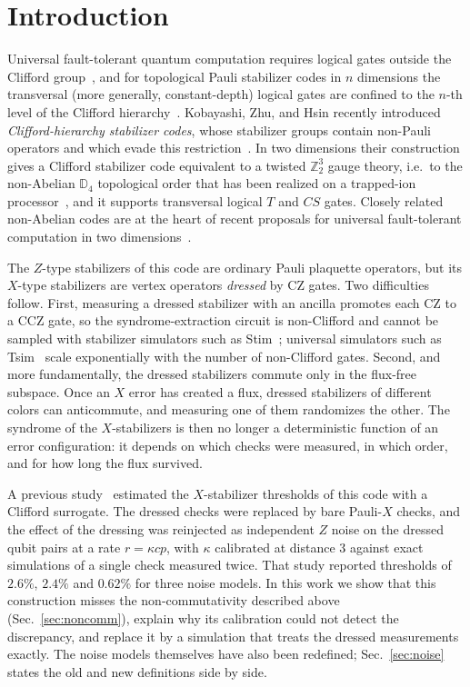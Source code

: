 \documentclass[a4paper]{article}
\begin{document}

\section{Introduction}
\label{sec:intro}

Universal fault-tolerant quantum computation requires logical gates outside the Clifford group~\cite{eastin-knill2009}, and for topological Pauli stabilizer codes in $n$ dimensions the transversal (more generally, constant-depth) logical gates are confined to the $n$-th level of the Clifford hierarchy~\cite{bravyikonig2013}. Kobayashi, Zhu, and Hsin recently introduced \emph{Clifford-hierarchy stabilizer codes}, whose stabilizer groups contain non-Pauli operators and which evade this restriction~\cite{kobayashi2025clifford}. In two dimensions their construction gives a Clifford stabilizer code equivalent to a twisted $\mathbb{Z}_2^3$ gauge theory, i.e.\ to the non-Abelian $\mathbb{D}_4$ topological order that has been realized on a trapped-ion processor~\cite{iqbal2024nonabelian}, and it supports transversal logical $T$ and $CS$ gates. Closely related non-Abelian codes are at the heart of recent proposals for universal fault-tolerant computation in two dimensions~\cite{davydova2025knots,magdalena2026}.

The $Z$-type stabilizers of this code are ordinary Pauli plaquette operators, but its $X$-type stabilizers are vertex operators \emph{dressed} by CZ gates. Two difficulties follow. First, measuring a dressed stabilizer with an ancilla promotes each CZ to a CCZ gate, so the syndrome-extraction circuit is non-Clifford and cannot be sampled with stabilizer simulators such as Stim~\cite{gidney2021stim,gottesmanknill1998}; universal simulators such as Tsim~\cite{haenel2026tsim} scale exponentially with the number of non-Clifford gates. Second, and more fundamentally, the dressed stabilizers commute only in the flux-free subspace. Once an $X$ error has created a flux, dressed stabilizers of different colors can anticommute, and measuring one of them randomizes the other. The syndrome of the $X$-stabilizers is then no longer a deterministic function of an error configuration: it depends on which checks were measured, in which order, and for how long the flux survived.

A previous study~\cite{haga2026aqis} estimated the $X$-stabilizer thresholds of this code with a Clifford surrogate. The dressed checks were replaced by bare Pauli-$X$ checks, and the effect of the dressing was reinjected as independent $Z$ noise on the dressed qubit pairs at a rate $r=\kappa c p$, with $\kappa$ calibrated at distance $3$ against exact simulations of a single check measured twice. That study reported thresholds of $2.6\%$, $2.4\%$ and $0.62\%$ for three noise models. In this work we show that this construction misses the non-commutativity described above (Sec.~\ref{sec:noncomm}), explain why its calibration could not detect the discrepancy, and replace it by a simulation that treats the dressed measurements exactly. The noise models themselves have also been redefined; Sec.~\ref{sec:noise} states the old and new definitions side by side.
\end{document}

